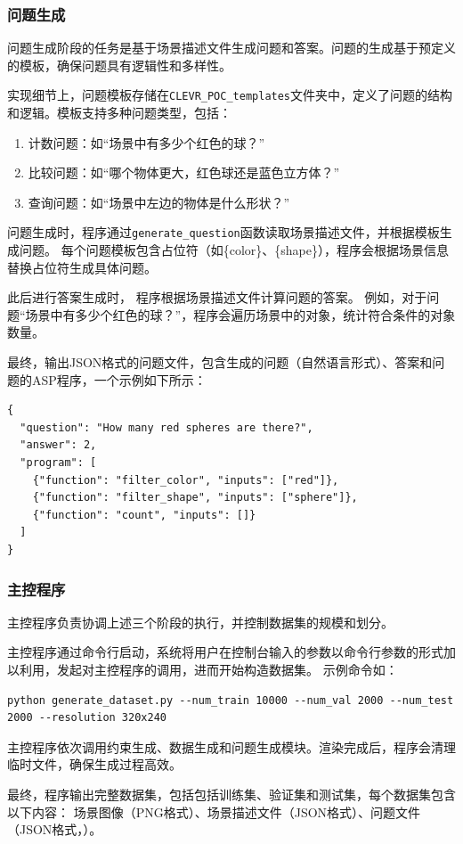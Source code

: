 \subsubsection{问题生成}
问题生成阶段的任务是基于场景描述文件生成问题和答案。问题的生成基于预定义的模板，确保问题具有逻辑性和多样性。

实现细节上，问题模板存储在\texttt{CLEVR\_POC\_templates}文件夹中，定义了问题的结构和逻辑。模板支持多种问题类型，包括：
\begin{enumerate}[nosep]
\item 计数问题：如“场景中有多少个红色的球？”
\item 比较问题：如“哪个物体更大，红色球还是蓝色立方体？”
\item 查询问题：如“场景中左边的物体是什么形状？”
\end{enumerate}

问题生成时，程序通过\texttt{generate\_question}函数读取场景描述文件，并根据模板生成问题。
每个问题模板包含占位符（如\{color\}、\{shape\}），程序会根据场景信息替换占位符生成具体问题。

此后进行答案生成时，
程序根据场景描述文件计算问题的答案。
例如，对于问题“场景中有多少个红色的球？”，程序会遍历场景中的对象，统计符合条件的对象数量。

最终，输出JSON格式的问题文件，包含生成的问题（自然语言形式）、答案和问题的ASP程序，一个示例如下所示：
\begin{lstlisting}
{
  "question": "How many red spheres are there?",
  "answer": 2,
  "program": [
    {"function": "filter_color", "inputs": ["red"]},
    {"function": "filter_shape", "inputs": ["sphere"]},
    {"function": "count", "inputs": []}
  ]
}
\end{lstlisting}
\subsubsection{主控程序}
主控程序负责协调上述三个阶段的执行，并控制数据集的规模和划分。

主控程序通过命令行启动，系统将用户在控制台输入的参数以命令行参数的形式加以利用，发起对主控程序的调用，进而开始构造数据集。
示例命令如：
\begin{lstlisting}
python generate_dataset.py --num_train 10000 --num_val 2000 --num_test 2000 --resolution 320x240
\end{lstlisting}
主控程序依次调用约束生成、数据生成和问题生成模块。渲染完成后，程序会清理临时文件，确保生成过程高效。

最终，程序输出完整数据集，包括包括训练集、验证集和测试集，每个数据集包含以下内容：
场景图像（PNG格式）、场景描述文件（JSON格式）、问题文件（JSON格式，）。
